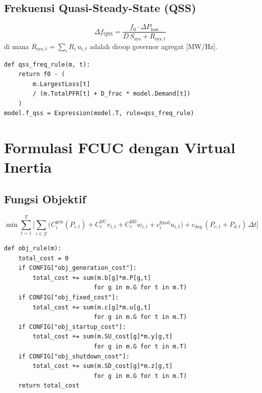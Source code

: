 \documentclass[journal]{IEEEtran}
\newcommand{\Ploss}{\Delta P_{\mathrm{loss}}}
\begin{document}
\subsection{Frekuensi Quasi-Steady-State (QSS)}

\begin{equation}
  \Delta f_{\mathrm{QSS}} =
    \frac{f_0 \cdot \Ploss}{D\,S_{\mathrm{sys}} + R_{\mathrm{sys},t}}
  \label{eq:qss}
\end{equation}
di mana $R_{\mathrm{sys},t} = \sum_{i} R_i\,u_{i,t}$
adalah droop governor agregat [MW/Hz].

\begin{lstlisting}[style=pycode,caption={Estimasi frekuensi QSS (Cell 26)}]
def qss_freq_rule(m, t):
    return f0 - (
        m.LargestLoss[t]
        / (m.TotalPFR[t] + D_frac * model.Demand[t])
    )
model.f_qss = Expression(model.T, rule=qss_freq_rule)
\end{lstlisting}

\section{Formulasi FCUC dengan Virtual Inertia}
\label{sec:formulation}

\subsection{Fungsi Objektif}

\begin{equation}
  \min \sum_{t=1}^{T} \Bigg[
    \sum_{i \in \mathcal{G}} \Big(
      C_i^{\mathrm{gen}}(P_{i,t})
      + C_i^{\mathrm{SU}} v_{i,t}
      + C_i^{\mathrm{SD}} w_{i,t}
      + c_i^{\mathrm{fixed}} u_{i,t}
    \Big)
    + c_{\mathrm{deg}}\,(P_{c,t}+P_{d,t})\,\Delta t
  \Bigg]
  \label{eq:obj}
\end{equation}

\begin{lstlisting}[style=pycode,caption={Fungsi objektif modular (Cell 28)}]
def obj_rule(m):
    total_cost = 0
    if CONFIG["obj_generation_cost"]:
        total_cost += sum(m.b[g]*m.P[g,t]
                         for g in m.G for t in m.T)
    if CONFIG["obj_fixed_cost"]:
        total_cost += sum(m.c[g]*m.u[g,t]
                         for g in m.G for t in m.T)
    if CONFIG["obj_startup_cost"]:
        total_cost += sum(m.SU_cost[g]*m.y[g,t]
                         for g in m.G for t in m.T)
    if CONFIG["obj_shutdown_cost"]:
        total_cost += sum(m.SD_cost[g]*m.z[g,t]
                         for g in m.G for t in m.T)
    return total_cost
\end{lstlisting}
\end{document}
